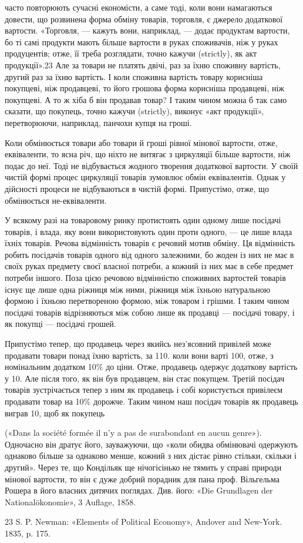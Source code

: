 часто повторюють сучасні економісти, а саме тоді, коли вони
намагаються довести, що розвинена форма обміну товарів, торговля,
є джерело додаткової вартости. «Торговля, — кажуть вони,
наприклад, — додає продуктам вартости, бо ті самі продукти
мають більше вартости в руках споживачів, ніж у руках продуцентів;
отже, її треба розглядати, точно кажучи (strictly), як
акт продукції».23 Але за товари не платять двічі, раз за їхню
споживну вартість, другий раз за їхню вартість. І коли споживна
вартість товару корисніша покупцеві, ніж продавцеві, то його
грошова форма корисніша продавцеві, ніж покупцеві. А то ж
хіба б він продавав товар? І таким чином можна б так само сказати,
що покупець, точно кажучи (strictly), виконує «акт продукції»,
перетворюючи, наприклад, панчохи купця на гроші.

Коли обмінюється товари або товари й гроші рівної мінової
вартости, отже, еквіваленти, то ясна річ, що ніхто не витягає
з циркуляції більше вартости, ніж подає до неї. Тоді не відбувається
жодного творення додаткової вартости. У своїй чистій
формі процес циркуляції товарів зумовлює обмін еквівалентів.
Однак у дійсності процеси не відбуваються в чистій формі. Припустімо,
отже, що обмінюється не-еквіваленти.

У всякому разі на товаровому ринку протистоять один одному
лише посідачі товарів, і влада, яку вони використовують один
проти одного, — це лише влада їхніх товарів. Речова відмінність
товарів є речовий мотив обміну. Ця відмінність робить посідачів
товарів одного від одного залежними, бо жоден із них не має в
своїх руках предмету своєї власної потреби, а кожний із них
має в себе предмет потреби іншого. Поза цією речовою відмінністю
споживних вартостей товарів існує ще лише одна ріжниця
між ними, ріжниця між їхньою натуральною формою і їхньою
перетвореною формою, між товаром і грішми. І таким чином
посідачі товарів відрізняються між собою лише як продавці —
посідачі товару, і як покупці — посідачі грошей.

Припустімо тепер, що продавець через якийсь нез’ясовний
привілей може продавати товари понад їхню вартість, за 110.
коли вони варті 100, отже, з номінальним додатком 10\% до ціни.
Отже, продавець одержує додаткову вартість у 10. Але після
того, як він був продавцем, він стає покупцем. Третій посідач
товарів зустрічається тепер з ним як продавець і собі користується
привілеєм продавати товар на 10\% дорожче. Таким чином
наш посідач товарів як продавець виграв 10, щоб як покупець

(«Dans la société formée il n’y a pas de surabondant en aucun genre»).
Одночасно він дратує його, зауважуючи, що «коли обидва обмінювачі
одержують однаково більше за однаково менше, кожний з них дістає
рівно стільки, скільки і другий». Через те, що Кондільяк ще нічогісінько
не тямить у справі природи мінової вартости, то він є дуже добрий порадник
для пана проф. Вільгельма Рошера в його власних дитячих поглядах.
Див. його: «Die Grundlagen der Nationalökonomie», 3 Auflage,
1858.

23    S. P. Newman: «Elements of Political Economy», Andover and
New-York. 1835, p. 175.
